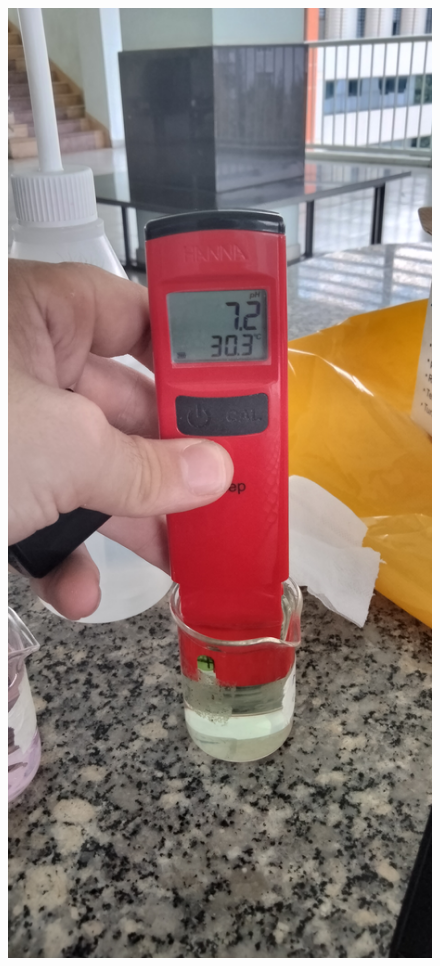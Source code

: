 \begin{figure}[h]
  \centering
  \begin{minipage}[b]{0.2\textwidth}
    \includegraphics[width=\textwidth]{sensors/16_ph7_hanna.jpg}

\end{minipage}
\end{figure}
